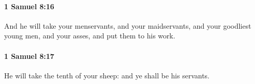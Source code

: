		\paragraph{1 Samuel 8:16} %
			\label{1SAMUEL-8-16}

			And he will take your menservants, and your maidservants, and your goodliest young men, and your asses, and put them to his work.


		\paragraph{1 Samuel 8:17} %
			\label{1SAMUEL-8-17}

			He will take the tenth of your sheep: and ye shall be his servants.


